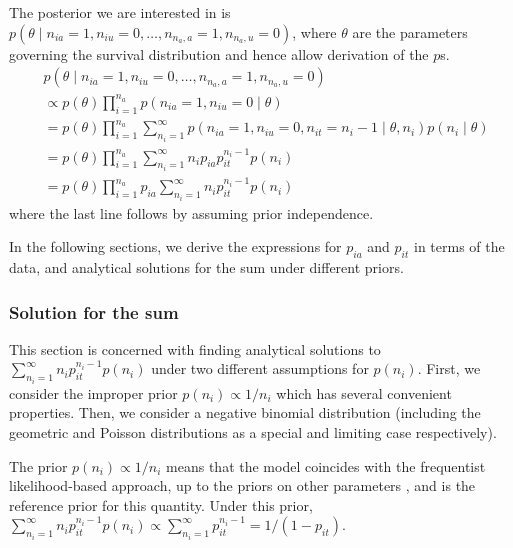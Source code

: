 \documentclass[main.tex]{subfiles}
\begin{document}
The posterior we are interested in is
$p(\theta \mid n_{ia} = 1, n_{iu} = 0, \dots, n_{n_a,a} = 1, n_{n_a,u} = 0)$,
where $\theta$ are the parameters governing the survival distribution
and hence allow derivation of the $p$s.
\begin{align}
&p(\theta \mid n_{ia} = 1, n_{iu} = 0, \dots, n_{n_a,a} = 1, n_{n_a,u} = 0) \\
&\propto p(\theta) \prod_{i=1}^{n_a} p(n_{ia} = 1, n_{iu} = 0 \mid \theta) \\
&= p(\theta) \prod_{i=1}^{n_a} \sum_{n_i=1}^\infty p(n_{ia} = 1, n_{iu} = 0, n_{it} = n_i - 1 \mid \theta, n_i) p(n_i \mid \theta) \\
&= p(\theta) \prod_{i=1}^{n_a} \sum_{n_i=1}^\infty n_i p_{ia} p_{it}^{n_i- 1} p(n_i) \\
&= p(\theta) \prod_{i=1}^{n_a} p_{ia} \sum_{n_i=1}^\infty n_i p_{it}^{n_i- 1} p(n_i)
\end{align}
where the last line follows by assuming prior independence.

In the following sections, we derive the expressions for $p_{ia}$ and
$p_{it}$ in terms of the data, and analytical solutions for the sum
under different priors.

\subsubsection{Solution for the sum}\label{solution-for-the-sum}

This section is concerned with finding analytical solutions to
$\sum_{n_i=1}^\infty n_i p_{it}^{n_i- 1} p(n_i)$ under two different
assumptions for $p(n_i)$. First, we consider the improper prior
$p(n_i) \propto 1/n_i$ which has several convenient properties. Then,
we consider a negative binomial distribution (including the geometric
and Poisson distributions as a special and limiting case respectively).

The prior $p(n_i) \propto 1/n_i$ means that the model coincides with
the frequentist likelihood-based approach, up to the priors on other
parameters \cites[section 4.2]{dempsterMaximum}{heiseyModelling}[section 8.7.5]{gelmanBayesian}, and is
the reference prior for this quantity\autocite{heBayesiana}. Under this prior,
$\sum_{n_i=1}^\infty n_i p_{it}^{n_i- 1} p(n_i) \propto \sum_{n_i=1}^\infty p_{it}^{n_i-1} = 1/(1-p_{it})$.
\end{document}
